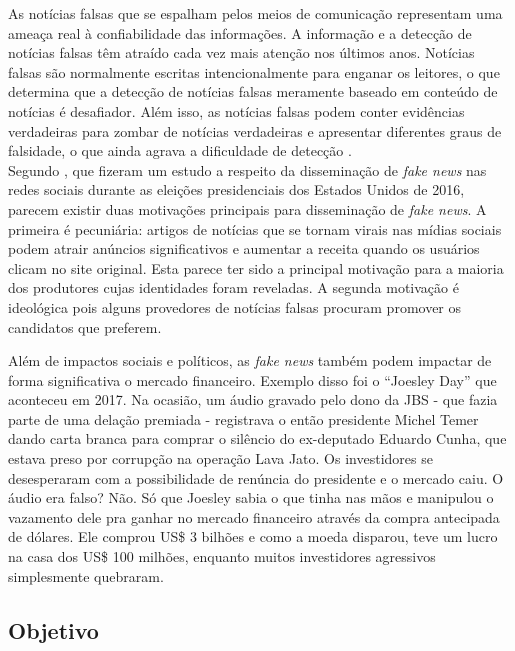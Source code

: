 
As notícias falsas que se espalham pelos meios de comunicação representam uma ameaça real à confiabilidade das informações.
A informação e a detecção de notícias falsas têm atraído cada vez mais atenção nos últimos anos. 
Notícias falsas são normalmente escritas intencionalmente para enganar os leitores, o que determina que a detecção de notícias falsas 
meramente baseado em conteúdo de notícias é  desafiador.
Além isso, as notícias falsas podem
conter evidências verdadeiras para zombar de notícias verdadeiras e apresentar diferentes graus de falsidade, o que ainda
agrava a dificuldade de detecção \cite{karimi2018}. \\

Segundo \cite{allcot2017}, que fizeram um estudo a respeito da disseminação de \textit{fake news} nas redes sociais durante as eleições presidenciais dos Estados Unidos de 2016, parecem existir duas motivações principais para disseminação de \textit{fake news}. 
A primeira é pecuniária: artigos de notícias que se tornam virais nas mídias sociais podem atrair anúncios significativos e aumentar a receita quando os usuários clicam no site original. 
Esta parece ter sido a principal motivação para a maioria dos produtores cujas identidades foram reveladas. 
A segunda motivação é ideológica pois alguns provedores de notícias falsas procuram promover os candidatos que preferem. 

Além de impactos sociais e políticos, as \textit{fake news} também podem impactar de forma significativa o mercado financeiro.
Exemplo disso foi o ``Joesley Day'' \cite{shs2020} que aconteceu em 2017. 
Na ocasião, um áudio gravado pelo dono da JBS - que fazia parte de uma delação premiada - registrava o então presidente Michel Temer dando carta branca para comprar o silêncio do ex-deputado Eduardo Cunha, que estava preso por corrupção na operação Lava Jato.
Os investidores se desesperaram com a possibilidade de renúncia do presidente e o mercado caiu. 
O áudio era falso? Não. 
Só que Joesley sabia o que tinha nas mãos e manipulou o vazamento dele pra ganhar no mercado financeiro através da compra antecipada de dólares. 
Ele comprou US\$ 3 bilhões e como a moeda disparou, teve um lucro na casa dos US\$ 100 milhões, enquanto muitos investidores agressivos simplesmente quebraram.

\subsection{Objetivo}

